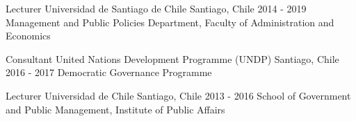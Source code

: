 





\begin{cventries}
\cventry
{Lecturer} 
{Universidad de Santiago de Chile} 
{Santiago, Chile} 
{2014 - 2019}
{Management and Public Policies Department, Faculty of Administration and Economics} \vspace{1.5mm}

\cventry
{Consultant} 
{United Nations Development Programme (UNDP)} 
{Santiago, Chile} 
{2016 - 2017}
{Democratic Governance Programme} \vspace{1.5mm}

\cventry
{Lecturer} 
{Universidad de Chile} 
{Santiago, Chile} 
{2013 - 2016}
{School of Government and Public Management, Institute of Public Affairs}\vspace{1.5mm}
\end{cventries}
\pagebreak